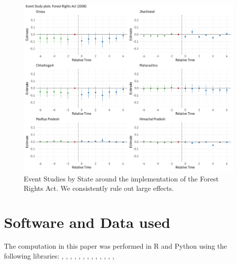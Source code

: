 \documentclass[12pt,reqno]{article}
\begin{document}
\begin{refsection}
\begin{figure}[htbp!]
  \centering
  \includegraphics[]{Output/fra_event_studies.pdf}
  \caption{Event Studies by State around the implementation of the Forest Rights Act. We consistently rule out large effects.}
  \label{fig:FRA_evstud}
\end{figure}

\newpage


\section{Software and Data used}
The computation in this paper was performed in R and Python using the following libraries:
\textcite{wickhamGgplot2ElegantGraphics2010}, 
\textcite{wickhamDplyrGrammarData2015}, 
\textcite{gaureLfeLinearGroup2013}, 
\textcite{mckinneyPandasFoundationalPython2011}, 
\textcite{jordahlGeoPandasPythonTools2014}, 
\textcite{waltNumPyArrayStructure2011},
\textcite{hunterMatplotlib2DGraphics2007},
\textcite{hainmueller2019much}, 
\textcite{hlavac2015stargazer},
\textcite{cattaneo2019binscatter},
\textcite{almn2020},
\textcite{dcskkt2015},
\textcite{asher2019rent}, 
\textcite{Hansen2013-vk}



\printbibliography[heading=subbibliography]
\end{refsection}

\end{document}
